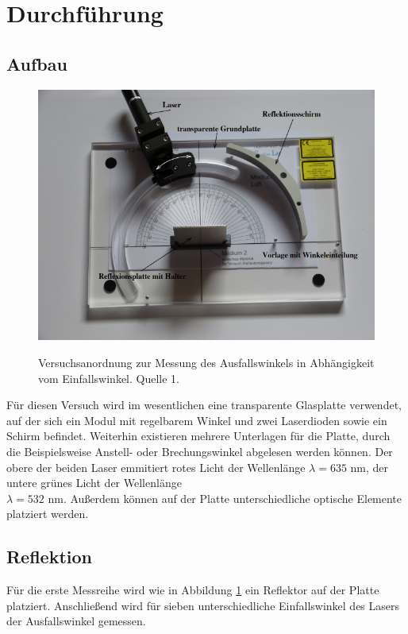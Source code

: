 \section{Durchführung}
\subsection{Aufbau}
\begin{figure} [h]
    \centering
    \includegraphics[width=12cm, keepaspectratio]{Reflexion Aufbau}
    \label{fig:Reflexion}
    \caption{Versuchsanordnung zur Messung des Ausfallswinkels in Abhängigkeit vom Einfallswinkel. Quelle 1.}
 \end{figure}
Für diesen Versuch wird im wesentlichen eine transparente Glasplatte verwendet, auf der sich ein Modul mit regelbarem Winkel und zwei Laserdioden sowie ein Schirm befindet. Weiterhin existieren mehrere Unterlagen für die Platte, durch die Beispielsweise Anstell- oder Brechungswinkel abgelesen werden können. Der obere der beiden Laser emmitiert rotes Licht der Wellenlänge  $\lambda=635$ nm, der untere grünes Licht der Wellenlänge \\ $\lambda=532$ nm. Außerdem können auf der Platte unterschiedliche optische Elemente platziert werden.
\subsection{Reflektion}
Für die erste Messreihe wird wie in Abbildung \ref{fig:Reflexion} ein Reflektor auf der Platte platziert. Anschließend wird für sieben unterschiedliche Einfallswinkel des Lasers der Ausfallswinkel gemessen.
